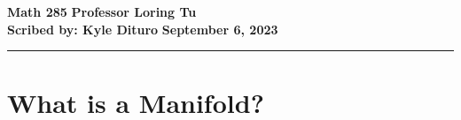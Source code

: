 \documentclass[12pt, twosided]{article}
\begin{document}
\noindent \textbf{Math 285} \hfill \textbf{Professor Loring Tu} \\
\textbf{Scribed by: Kyle Dituro} \hfill \textbf{September 6\tht, 2023}\hrule
\vspace{.2in}

\section{What is a Manifold?}
\end{document}

